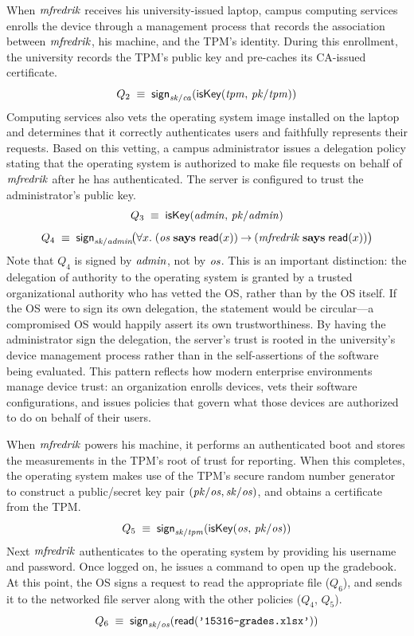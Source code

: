 \documentclass[11pt]{article}
\newcommand{\pk}[1]{\ensuremath{\mi{pk/#1}}}
\newcommand{\sk}[1]{\ensuremath{\mi{sk/#1}}}
\newcommand{\sign}[1]{\ms{sign}_{#1}}
\newcommand{\iskey}[2]{\ms{isKey}(#1,\, #2)}
\newcommand{\readf}[1]{\ms{read}(#1)}
\begin{document}
When $\mathit{mfredrik}$ receives his university-issued laptop, campus computing services enrolls the device through a management process that records the association between $\mathit{mfredrik}$, his machine, and the TPM's identity. During this enrollment, the university records the TPM's public key and pre-caches its CA-issued certificate.
\[
  Q_2 \;\equiv\; \sign{\sk{ca}}(\iskey{\mi{tpm}}{\pk{tpm}})
\]
Computing services also vets the operating system image installed on the laptop and determines that it correctly authenticates users and faithfully represents their requests. Based on this vetting, a campus administrator issues a delegation policy stating that the operating system is authorized to make file requests on behalf of $\mathit{mfredrik}$ after he has authenticated. The server is configured to trust the administrator's public key.
\[
  Q_3 \;\equiv\; \iskey{\mi{admin}}{\pk{admin}}
\]
\[
  Q_4 \;\equiv\;
    \sign{\sk{admin}}\!\bigl(
      \forall x.\;
      (\mi{os} \says \readf{x}) \arrow (\mi{mfredrik} \says \readf{x})
    \bigr)
\]
Note that $Q_4$ is signed by $\mathit{admin}$, not by $\mathit{os}$. This is an important distinction: the delegation of authority to the operating system is granted by a trusted organizational authority who has vetted the OS, rather than by the OS itself. If the OS were to sign its own delegation, the statement would be circular---a compromised OS would happily assert its own trustworthiness. By having the administrator sign the delegation, the server's trust is rooted in the university's device management process rather than in the self-assertions of the software being evaluated. This pattern reflects how modern enterprise environments manage device trust: an organization enrolls devices, vets their software configurations, and issues policies that govern what those devices are authorized to do on behalf of their users.

When $\mathit{mfredrik}$ powers his machine, it performs an authenticated boot and stores the measurements in the TPM's root of trust for reporting. When this completes, the operating system makes use of the TPM's secure random number generator to construct a public/secret key pair $(\pk{os},\sk{os})$, and obtains a certificate from the TPM.
\[
  Q_5 \;\equiv\; \sign{\sk{tpm}}(\iskey{\mi{os}}{\pk{os}})
\]
Next $\mathit{mfredrik}$ authenticates to the operating system by providing his username and password. Once logged on, he issues a command to open up the gradebook. At this point, the OS signs a request to read the appropriate file ($Q_6$), and sends it to the networked file server along with the other policies ($Q_4$, $Q_5$).
\[
  Q_6 \;\equiv\; \sign{\sk{os}}(\readf{\texttt{'15316-grades.xlsx'}})
\]
\end{document}
